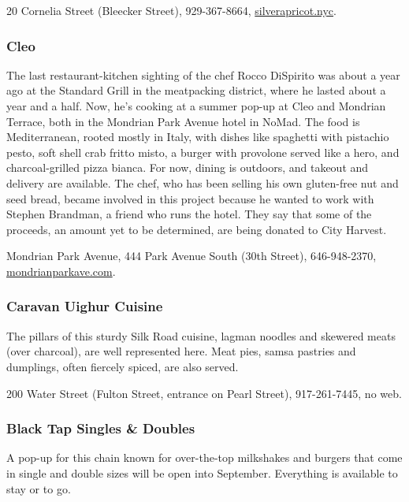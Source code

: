 20 Cornelia Street (Bleecker Street), 929-367-8664,
\href{https://www.silverapricot.nyc/}{silverapricot.nyc}.

\hypertarget{cleo}{%
\subsubsection{Cleo}\label{cleo}}

The last restaurant-kitchen sighting of the chef Rocco DiSpirito was
about a year ago at the Standard Grill in the meatpacking district,
where he lasted about a year and a half. Now, he's cooking at a summer
pop-up at Cleo and Mondrian Terrace, both in the Mondrian Park Avenue
hotel in NoMad. The food is Mediterranean, rooted mostly in Italy, with
dishes like spaghetti with pistachio pesto, soft shell crab fritto
misto, a burger with provolone served like a hero, and charcoal-grilled
pizza bianca. For now, dining is outdoors, and takeout and delivery are
available. The chef, who has been selling his own gluten-free nut and
seed bread, became involved in this project because he wanted to work
with Stephen Brandman, a friend who runs the hotel. They say that some
of the proceeds, an amount yet to be determined, are being donated to
City Harvest.

Mondrian Park Avenue, 444 Park Avenue South (30th Street), 646-948-2370,
\href{http://www.mondrianparkave.com/}{mondrianparkave.com}.

\hypertarget{caravan-uighur-cuisine-}{%
\subsubsection{Caravan Uighur Cuisine }\label{caravan-uighur-cuisine-}}

The pillars of this sturdy Silk Road cuisine, lagman noodles and
skewered meats (over charcoal), are well represented here. Meat pies,
samsa pastries and dumplings, often fiercely spiced, are also served.

200 Water Street (Fulton Street, entrance on Pearl Street),
917-261-7445, no web.

\hypertarget{black-tap-singles--doubles-}{%
\subsubsection{Black Tap Singles \& Doubles
}\label{black-tap-singles--doubles-}}

A pop-up for this chain known for over-the-top milkshakes and burgers
that come in single and double sizes will be open into September.
Everything is available to stay or to go.

